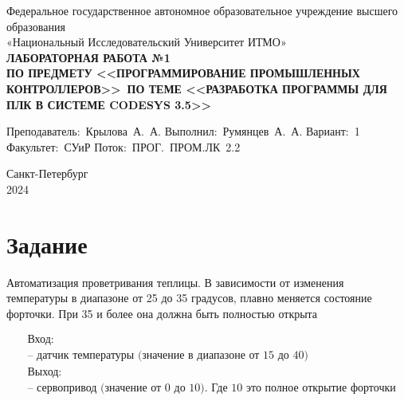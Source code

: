 \documentclass[a4paper, 16pt]{article}
\begin{document}
    \begin{titlepage}
        \begin{center}
        \vfill
        
        Федеральное государственное автономное образовательное учреждение высшего образования\\
        «Национальный Исследовательский Университет ИТМО»\ \\
        
        \vfill
        {\large\bf ЛАБОРАТОРНАЯ РАБОТА №1\\
            ПО ПРЕДМЕТУ <<ПРОГРАММИРОВАНИЕ ПРОМЫШЛЕННЫХ КОНТРОЛЛЕРОВ>>\
            ПО ТЕМЕ <<РАЗРАБОТКА ПРОГРАММЫ ДЛЯ ПЛК В СИСТЕМЕ CODESYS 3.5>>}
        \vfill
            
        \begin{flushright}  
            \begin{minipage}{.45\textwidth}
            {
                \hbox{Преподаватель: Крылова А. А.}
                \hbox{Выполнил: Румянцев А. А.}
                \hbox{Вариант: 1}
                \hbox{}
                \hbox{Факультет: СУиР}
                \hbox{Поток: ПРОГ. ПРОМ.ЛК 2.2}
            }
            \end{minipage}
        \end{flushright}
        
        \vfill
                
        Санкт-Петербург\\
        2024
        \end{center}
    \end{titlepage}
    \setlength{\parskip}{1.5mm}
    
    \tableofcontents

    \newpage
    \section{Задание}
    \noindent Автоматизация проветривания теплицы. В зависимости от изменения температуры в
    диапазоне от 25 до 35 градусов, плавно меняется состояние форточки. При 35 и
    более она должна быть полностью открыта


    \noindent
    \begin{align*}
        & \text{Вход:}\\
        & \text{– датчик температуры (значение в диапазоне от 15 до 40)}\\
        & \text{Выход:}\\
        & \text{– сервопривод (значение от 0 до 10). Где 10 это полное открытие форточки}
    \end{align*}
\end{document}
